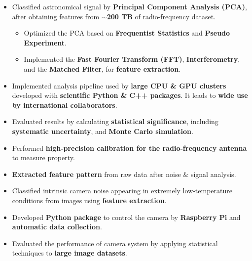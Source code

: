 \documentclass[10pt,a4paper,ragged2e,withhyper]{altacv}
\begin{document}

\begin{itemize}
\item Classified astronomical signal by {\bf Principal Component Analysis (PCA)}, after obtaining features from {\bf ${\sim}$200 TB} of radio-frequency dataset. 
\begin{itemize}
\item Optimized the PCA based on {\bf Frequentist Statistics} and {\bf Pseudo Experiment}.
\item Implemented the {\bf Fast Fourier Transform (FFT)}, {\bf Interferometry}, and the {\bf Matched Filter}, for {\bf feature extraction}.
\end{itemize}
\item Implemented analysis pipeline used by {\bf large CPU \& GPU clusters} developed with {\bf scientific Python \& C++ packages}. It leads to {\bf wide use by international collaborators}.
\item Evaluated results by calculating {\bf statistical significance}, including {\bf systematic uncertainty}, and {\bf Monte Carlo simulation}.
\end{itemize}
\begin{itemize}
\item Performed {\bf high-precision calibration for the radio-frequency antenna} to measure property.
\item {\bf Extracted feature pattern} from raw data after noise \& signal analysis.
\end{itemize}
\divider

\begin{itemize}
\item Classified intrinsic camera noise appearing in extremely low-temperature conditions from images using {\bf feature extraction}.
\item Developed {\bf Python package} to control the camera by {\bf Raspberry Pi} and {\bf automatic data collection}.
\item Evaluated the performance of camera system by applying statistical techniques to {\bf large image datasets}.
\end{itemize}
\end{document}
